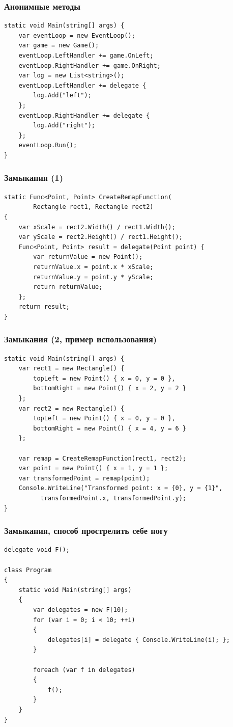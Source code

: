 \documentclass[xetex,mathserif,serif]{beamer}
\begin{document}
	\begin{frame}[fragile]
		\frametitle{Анонимные методы}
		\begin{verbatim}
static void Main(string[] args) {
    var eventLoop = new EventLoop();
    var game = new Game();
    eventLoop.LeftHandler += game.OnLeft;
    eventLoop.RightHandler += game.OnRight;
    var log = new List<string>();
    eventLoop.LeftHandler += delegate {
        log.Add("left");
    };
    eventLoop.RightHandler += delegate {
        log.Add("right");
    };
    eventLoop.Run();
}
		\end{verbatim}
	\end{frame}

	\begin{frame}[fragile]
		\frametitle{Замыкания (1)}
		\begin{verbatim}
static Func<Point, Point> CreateRemapFunction(
        Rectangle rect1, Rectangle rect2)
{
    var xScale = rect2.Width() / rect1.Width();
    var yScale = rect2.Height() / rect1.Height();
    Func<Point, Point> result = delegate(Point point) {
        var returnValue = new Point();
        returnValue.x = point.x * xScale;
        returnValue.y = point.y * yScale;
        return returnValue;
    };
    return result;
}
		\end{verbatim}
	\end{frame}

	\begin{frame}[fragile]
		\frametitle{Замыкания (2, пример использования)}
		\begin{small}
			\begin{verbatim}
static void Main(string[] args) {
    var rect1 = new Rectangle() {
        topLeft = new Point() { x = 0, y = 0 },
        bottomRight = new Point() { x = 2, y = 2 }
    };
    var rect2 = new Rectangle() {
        topLeft = new Point() { x = 0, y = 0 },
        bottomRight = new Point() { x = 4, y = 6 }
    };

    var remap = CreateRemapFunction(rect1, rect2);
    var point = new Point() { x = 1, y = 1 };
    var transformedPoint = remap(point);
    Console.WriteLine("Transformed point: x = {0}, y = {1}", 
          transformedPoint.x, transformedPoint.y);
}
			\end{verbatim}
		\end{small}
	\end{frame}

	\begin{frame}[fragile]
		\frametitle{Замыкания, способ прострелить себе ногу}
		\begin{small}
			\begin{verbatim}
delegate void F();

class Program
{
    static void Main(string[] args)
    {
        var delegates = new F[10];
        for (var i = 0; i < 10; ++i)
        {
            delegates[i] = delegate { Console.WriteLine(i); };
        }

        foreach (var f in delegates)
        {
            f();
        }
    }
}
			\end{verbatim}
		\end{small}
	\end{frame}
\end{document}
